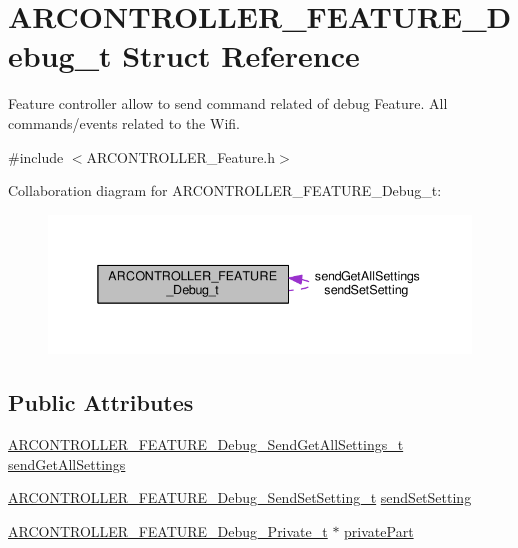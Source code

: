 \hypertarget{struct_a_r_c_o_n_t_r_o_l_l_e_r___f_e_a_t_u_r_e___debug__t}{}\section{A\+R\+C\+O\+N\+T\+R\+O\+L\+L\+E\+R\+\_\+\+F\+E\+A\+T\+U\+R\+E\+\_\+\+Debug\+\_\+t Struct Reference}
\label{struct_a_r_c_o_n_t_r_o_l_l_e_r___f_e_a_t_u_r_e___debug__t}


Feature controller allow to send command related of debug Feature. All commands/events related to the Wifi.  




{\ttfamily \#include $<$A\+R\+C\+O\+N\+T\+R\+O\+L\+L\+E\+R\+\_\+\+Feature.\+h$>$}



Collaboration diagram for A\+R\+C\+O\+N\+T\+R\+O\+L\+L\+E\+R\+\_\+\+F\+E\+A\+T\+U\+R\+E\+\_\+\+Debug\+\_\+t\+:
\nopagebreak
\begin{figure}[H]
\begin{center}
\leavevmode
\includegraphics[width=338pt]{struct_a_r_c_o_n_t_r_o_l_l_e_r___f_e_a_t_u_r_e___debug__t__coll__graph}
\end{center}
\end{figure}
\subsection*{Public Attributes}
\begin{DoxyCompactItemize}
\item 
\hyperlink{_a_r_c_o_n_t_r_o_l_l_e_r___feature_8h_a6af1a6fb063407974c21e6ce52c43531}{A\+R\+C\+O\+N\+T\+R\+O\+L\+L\+E\+R\+\_\+\+F\+E\+A\+T\+U\+R\+E\+\_\+\+Debug\+\_\+\+Send\+Get\+All\+Settings\+\_\+t} \hyperlink{struct_a_r_c_o_n_t_r_o_l_l_e_r___f_e_a_t_u_r_e___debug__t_ad616047d7d7316bfebbf56965c275f37}{send\+Get\+All\+Settings}
\item 
\hyperlink{_a_r_c_o_n_t_r_o_l_l_e_r___feature_8h_a8ff55bd60b067bd53e830711196f71b1}{A\+R\+C\+O\+N\+T\+R\+O\+L\+L\+E\+R\+\_\+\+F\+E\+A\+T\+U\+R\+E\+\_\+\+Debug\+\_\+\+Send\+Set\+Setting\+\_\+t} \hyperlink{struct_a_r_c_o_n_t_r_o_l_l_e_r___f_e_a_t_u_r_e___debug__t_acdaa60c7a4d653123b97ec441b7462e0}{send\+Set\+Setting}
\item 
\hyperlink{_a_r_c_o_n_t_r_o_l_l_e_r___feature_8h_af680cf1d5a66ff3365a640b28c94e263}{A\+R\+C\+O\+N\+T\+R\+O\+L\+L\+E\+R\+\_\+\+F\+E\+A\+T\+U\+R\+E\+\_\+\+Debug\+\_\+\+Private\+\_\+t} $\ast$ \hyperlink{struct_a_r_c_o_n_t_r_o_l_l_e_r___f_e_a_t_u_r_e___debug__t_a0943b715696c046cc0383dbc227c8be6}{private\+Part}
\end{DoxyCompactItemize}


